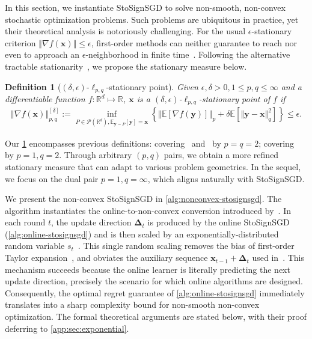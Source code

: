 \documentclass{article}
\newtheorem{defn}{Definition}
\def \y {\mathbf{y}}
\def \E {\mathbb{E}}
\def \x {\mathbf{x}}
\def \R {\mathbb{R}}
\def \P {\mathcal{P}}
\newcommand{\norm}[1]{\left\Vert#1\right\Vert}
\def \bDelta {\bm{\Delta}}
\newcommand{\sqbrac}[1]{\left[#1\right]}
\newcommand{\cbrac}[1]{\left\{#1\right\}}
\begin{document}
In this section, we instantiate StoSignSGD to solve non-smooth, non-convex stochastic optimization problems. Such problems are ubiquitous in practice, yet their theoretical analysis is notoriously challenging. For the usual $\epsilon$-stationary criterion $\norm{\nabla f(\x)}\le \epsilon$, first-order methods can neither guarantee to reach nor even to approach an $\epsilon$-neighborhood in finite time~\citep{zhang2020complexity,kornowski2022oracle}. Following the alternative tractable stationarity~\citep{zhang2020complexity}, we propose the stationary measure below.

\begin{defn}[$(\delta,\epsilon)$-$\ell_{p,q}$-stationary point]\label{def:stationary-point}
    Given $\epsilon,\delta> 0,1\le p,q\le\infty$ and a differentiable function $f:\R^d\mapsto\R$, $\x$ is a $(\delta,\epsilon)$-$\ell_{p,q}$-stationary point of $f$ if
    \begin{align*}
        \norm{\nabla f(\x)}_{p,q}^{[\delta]}:=\inf_{P\in\P(\R^d),\E_{\y\sim P}[\y]=\x}\cbrac{\norm{\E\sqbrac{\nabla f(\y)}}_p+\delta\E\sqbrac{\norm{\y-\x}_q^2}}\le\epsilon.
    \end{align*}
\end{defn}

Our \cref{def:stationary-point} encompasses previous definitions: covering~\citet[Definition~2.2]{zhang2024random} and~\citet[Definition~1]{ahn2025general} by $p=q=2$; covering~\citet[Definition~15]{ahn2024adamema} by $p=1,q=2$. Through arbitrary $(p,q)$ pairs, we obtain a more refined stationary measure that can adapt to various problem geometries. In the sequel, we focus on the dual pair $p=1,q=\infty$, which aligns naturally with StoSignSGD.

We present the non-convex StoSignSGD in \cref{alg:nonconvex-stosignsgd}. The algorithm instantiates the online-to-non-convex conversion introduced by~\citet{cutkosky2023optimal}. In each round $t$, the update direction $\bDelta_t$ is produced by the online StoSignSGD (\cref{alg:online-stosignsgd}) and is then scaled by an exponentially-distributed random variable $s_t$~\citep{zhang2024random}. This single random scaling removes the bias of first-order Taylor expansion~\citet{zhang2020complexity}, and obviates the auxiliary sequence $\x_{t-1}+\bDelta_t$ used in~\citet{cutkosky2023optimal}. This mechanism succeeds because the online learner is literally predicting the next update direction, precisely the scenario for which online algorithms are designed. Consequently, the optimal regret guarantee of \cref{alg:online-stosignsgd} immediately translates into a sharp complexity bound for non-smooth non-convex optimization. The formal theoretical arguments are stated below, with their proof deferring to \cref{app:sec:exponential}.
\end{document}
